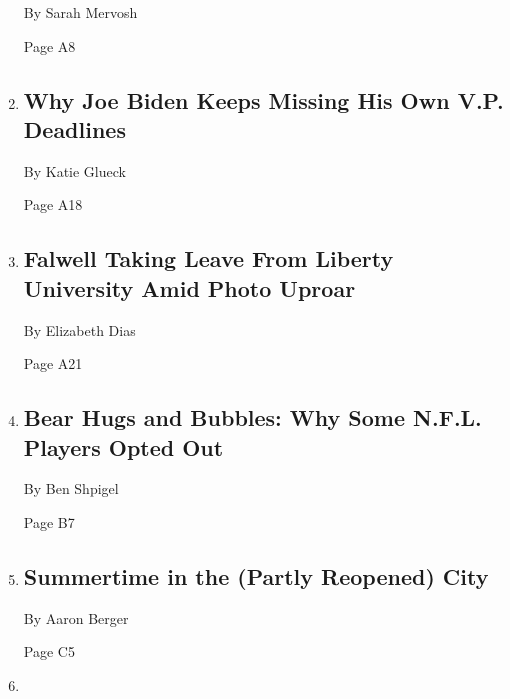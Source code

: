 \begin{enumerate}
  By Sarah Mervosh

  Page A8
\item
  \href{/2020/08/07/us/politics/joe-biden-vice-presidential-search.html}{}

  \hypertarget{why-joe-biden-keeps-missing-his-own-vp-deadlines}{%
  \subsection{Why Joe Biden Keeps Missing His Own V.P.
  Deadlines}\label{why-joe-biden-keeps-missing-his-own-vp-deadlines}}

  By Katie Glueck

  Page A18
\item
  \href{/2020/08/07/us/falwell-liberty.html}{}

  \hypertarget{falwell-taking-leave-from-liberty-university-amid-photo-uproar}{%
  \subsection{Falwell Taking Leave From Liberty University Amid Photo
  Uproar}\label{falwell-taking-leave-from-liberty-university-amid-photo-uproar}}

  By Elizabeth Dias

  Page A21
\item
  \href{/2020/08/08/sports/football/nfl-players-opt-out.html}{}

  \hypertarget{bear-hugs-and-bubbles-why-some-nfl-players-opted-out}{%
  \subsection{Bear Hugs and Bubbles: Why Some N.F.L. Players Opted
  Out}\label{bear-hugs-and-bubbles-why-some-nfl-players-opted-out}}

  By Ben Shpigel

  Page B7
\item
  \href{/2020/08/07/arts/design/high-line-governors-island-brooklyn-bridge-park.html}{}

  \hypertarget{summertime-in-the-partly-reopened-city}{%
  \subsection{Summertime in the (Partly Reopened)
  City}\label{summertime-in-the-partly-reopened-city}}

  By Aaron Berger

  Page C5
\item
  \href{/2020/08/06/movies/megan-fox-jennifers-body.html}{}


\end{enumerate}
